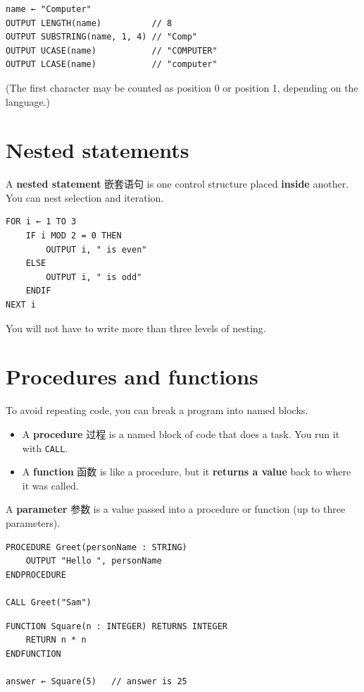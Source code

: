 \documentclass[11pt]{article}
\begin{document}
\begin{Verbatim}
name ← "Computer"
OUTPUT LENGTH(name)          // 8
OUTPUT SUBSTRING(name, 1, 4) // "Comp"
OUTPUT UCASE(name)           // "COMPUTER"
OUTPUT LCASE(name)           // "computer"
\end{Verbatim}

(The first character may be counted as position 0 or position 1, depending on the language.)

\section*{Nested statements}

A \textbf{nested statement} 嵌套语句 is one control structure placed \textbf{inside} another. You can nest selection and iteration.

\begin{Verbatim}
FOR i ← 1 TO 3
    IF i MOD 2 = 0 THEN
        OUTPUT i, " is even"
    ELSE
        OUTPUT i, " is odd"
    ENDIF
NEXT i
\end{Verbatim}

You will not have to write more than three levels of nesting.

\section*{Procedures and functions}

To avoid repeating code, you can break a program into named blocks.

\begin{itemize}
\item A \textbf{procedure} 过程 is a named block of code that does a task. You run it with \texttt{CALL}.

\item A \textbf{function} 函数 is like a procedure, but it \textbf{returns a value} back to where it was called.

\end{itemize}

A \textbf{parameter} 参数 is a value passed into a procedure or function (up to three parameters).

\begin{Verbatim}
PROCEDURE Greet(personName : STRING)
    OUTPUT "Hello ", personName
ENDPROCEDURE

CALL Greet("Sam")
\end{Verbatim}

\begin{Verbatim}
FUNCTION Square(n : INTEGER) RETURNS INTEGER
    RETURN n * n
ENDFUNCTION

answer ← Square(5)   // answer is 25
\end{Verbatim}
\end{document}
